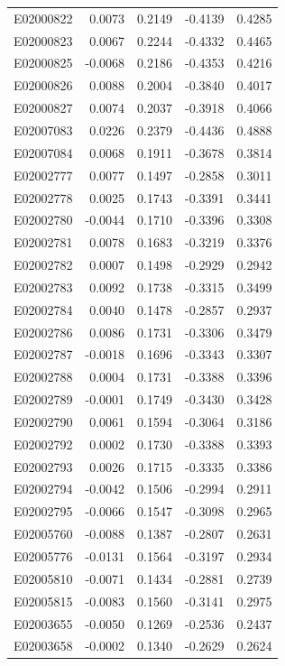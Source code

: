 \documentclass[11pt, a4paper]{article}
\begin{document}
\begin{longtable}{lrrrr}
E02000822 & 0.0073 & 0.2149 & -0.4139 & 0.4285 \\
E02000823 & 0.0067 & 0.2244 & -0.4332 & 0.4465 \\
E02000825 & -0.0068 & 0.2186 & -0.4353 & 0.4216 \\
E02000826 & 0.0088 & 0.2004 & -0.3840 & 0.4017 \\
E02000827 & 0.0074 & 0.2037 & -0.3918 & 0.4066 \\
E02007083 & 0.0226 & 0.2379 & -0.4436 & 0.4888 \\
E02007084 & 0.0068 & 0.1911 & -0.3678 & 0.3814 \\
E02002777 & 0.0077 & 0.1497 & -0.2858 & 0.3011 \\
E02002778 & 0.0025 & 0.1743 & -0.3391 & 0.3441 \\
E02002780 & -0.0044 & 0.1710 & -0.3396 & 0.3308 \\
E02002781 & 0.0078 & 0.1683 & -0.3219 & 0.3376 \\
E02002782 & 0.0007 & 0.1498 & -0.2929 & 0.2942 \\
E02002783 & 0.0092 & 0.1738 & -0.3315 & 0.3499 \\
E02002784 & 0.0040 & 0.1478 & -0.2857 & 0.2937 \\
E02002786 & 0.0086 & 0.1731 & -0.3306 & 0.3479 \\
E02002787 & -0.0018 & 0.1696 & -0.3343 & 0.3307 \\
E02002788 & 0.0004 & 0.1731 & -0.3388 & 0.3396 \\
E02002789 & -0.0001 & 0.1749 & -0.3430 & 0.3428 \\
E02002790 & 0.0061 & 0.1594 & -0.3064 & 0.3186 \\
E02002792 & 0.0002 & 0.1730 & -0.3388 & 0.3393 \\
E02002793 & 0.0026 & 0.1715 & -0.3335 & 0.3386 \\
E02002794 & -0.0042 & 0.1506 & -0.2994 & 0.2911 \\
E02002795 & -0.0066 & 0.1547 & -0.3098 & 0.2965 \\
E02005760 & -0.0088 & 0.1387 & -0.2807 & 0.2631 \\
E02005776 & -0.0131 & 0.1564 & -0.3197 & 0.2934 \\
E02005810 & -0.0071 & 0.1434 & -0.2881 & 0.2739 \\
E02005815 & -0.0083 & 0.1560 & -0.3141 & 0.2975 \\
E02003655 & -0.0050 & 0.1269 & -0.2536 & 0.2437 \\
E02003658 & -0.0002 & 0.1340 & -0.2629 & 0.2624 \\

\end{longtable}
\end{document}
